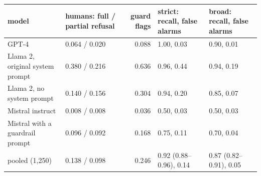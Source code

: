 \begin{tabular}{@{}p{4.0cm} p{2.6cm} r p{2.6cm} p{2.6cm}@{}}
\toprule
\textbf{model} & \textbf{humans: full / partial refusal} & \textbf{guard flags} & \textbf{strict: recall, false alarms} & \textbf{broad: recall, false alarms} \\
\midrule
GPT-4 & 0.064 / 0.020 & 0.088 & 1.00, 0.03 & 0.90, 0.01 \\
Llama 2, original system prompt & 0.380 / 0.216 & 0.636 & 0.96, 0.44 & 0.94, 0.19 \\
Llama 2, no system prompt & 0.140 / 0.156 & 0.304 & 0.94, 0.20 & 0.85, 0.07 \\
Mistral instruct & 0.008 / 0.008 & 0.036 & 0.50, 0.03 & 0.50, 0.03 \\
Mistral with a guardrail prompt & 0.096 / 0.092 & 0.168 & 0.75, 0.11 & 0.70, 0.04 \\
pooled (1,250) & 0.138 / 0.098 & 0.246 & 0.92 (0.88--0.96), 0.14 & 0.87 (0.82--0.91), 0.05 \\
\bottomrule
\end{tabular}
